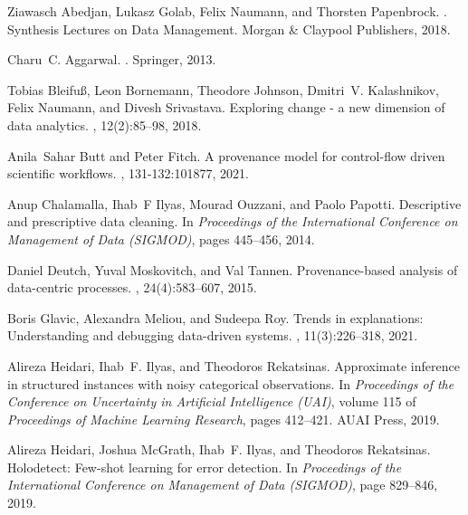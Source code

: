 \documentclass[11pt]{article}
\begin{document}

\providecommand{\noopsort}[1]{}
\begin{thebibliography}{10}

Ziawasch Abedjan, Lukasz Golab, Felix Naumann, and Thorsten Papenbrock.
.
\newblock Synthesis Lectures on Data Management. Morgan {\&} Claypool
  Publishers, 2018.

Charu~C. Aggarwal.
.
\newblock Springer, 2013.

Tobias Bleifu\ss, Leon Bornemann, Theodore Johnson, Dmitri~V. Kalashnikov,
  Felix Naumann, and Divesh Srivastava.
\newblock Exploring change - a new dimension of data analytics.
, 12(2):85--98, 2018.

Anila~Sahar Butt and Peter Fitch.
\newblock A provenance model for control-flow driven scientific workflows.
, 131-132:101877, 2021.

Anup Chalamalla, Ihab~F Ilyas, Mourad Ouzzani, and Paolo Papotti.
\newblock Descriptive and prescriptive data cleaning.
\newblock In {\em Proceedings of the International Conference on Management of
  Data (SIGMOD)}, pages 445--456, 2014.

Daniel Deutch, Yuval Moskovitch, and Val Tannen.
\newblock Provenance-based analysis of data-centric processes.
, 24(4):583--607, 2015.

Boris Glavic, Alexandra Meliou, and Sudeepa Roy.
\newblock Trends in explanations: Understanding and debugging data-driven
  systems.
, 11(3):226--318, 2021.

Alireza Heidari, Ihab~F. Ilyas, and Theodoros Rekatsinas.
\newblock Approximate inference in structured instances with noisy categorical
  observations.
\newblock In {\em Proceedings of the Conference on Uncertainty in Artificial
  Intelligence (UAI)}, volume 115 of {\em Proceedings of Machine Learning
  Research}, pages 412--421. {AUAI} Press, 2019.

Alireza Heidari, Joshua McGrath, Ihab~F. Ilyas, and Theodoros Rekatsinas.
\newblock Holodetect: Few-shot learning for error detection.
\newblock In {\em Proceedings of the International Conference on Management of
  Data (SIGMOD)}, page 829–846, 2019.


\end{thebibliography}
\end{document}
